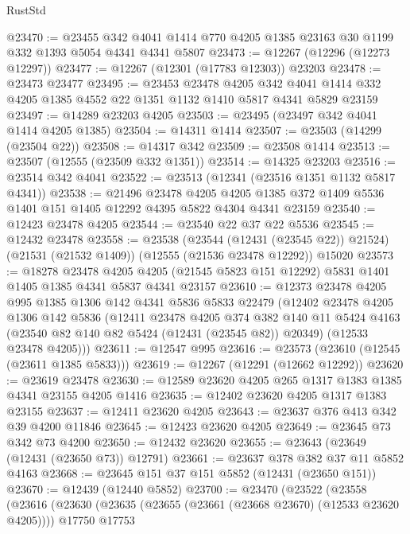 \begin{lexlean}{RustStd}
\begin{coremodule}
@23470 := @23455
    @342
    @4041
    @1414
    @770
    @4205
    @1385
    @23163
    @30
    @1199
    @332
    @1393
    @5054
    @4341
    @4341
    @5807
@23473 := @12267 (@12296 (@12273 @12297))
@23477 := @12267 (@12301 (@17783 @12303)) @23203
@23478 := @23473 @23477
@23495 := @23453
    @23478
    @4205
    @342
    @4041
    @1414
    @332
    @4205
    @1385
    @4552
    @22
    @1351
    @1132
    @1410
    @5817
    @4341
    @5829
    @23159
@23497 := @14289 @23203 @4205
@23503 := @23495 (@23497 @342 @4041 @1414 @4205 @1385)
@23504 := @14311 @1414
@23507 := @23503 (@14299 (@23504 @22))
@23508 := @14317 @342
@23509 := @23508 @1414
@23513 := @23507 (@12555 (@23509 @332 @1351))
@23514 := @14325 @23203
@23516 := @23514 @342 @4041
@23522 := @23513 (@12341 (@23516 @1351 @1132 @5817 @4341))
@23538 := @21496
    @23478
    @4205
    @4205
    @1385
    @372
    @1409
    @5536
    @1401
    @151
    @1405
    @12292
    @4395
    @5822
    @4304
    @4341
    @23159
@23540 := @12423 @23478 @4205
@23544 := @23540 @22 @37 @22 @5536
@23545 := @12432 @23478
@23558 := @23538
    (@23544 (@12431 (@23545 @22)) @21524)
    (@21531 (@21532 @1409))
    (@12555 (@21536 @23478 @12292))
    @15020
@23573 := @18278
    @23478
    @4205
    @4205
    (@21545 @5823 @151 @12292)
    @5831
    @1401
    @1405
    @1385
    @4341
    @5837
    @4341
    @23157
@23610 := @12373
    @23478
    @4205
    @995
    @1385
    @1306
    @142
    @4341
    @5836
    @5833
    @22479
    (@12402
      @23478
      @4205
      @1306
      @142
      @5836
      (@12411
        @23478
        @4205
        @374
        @382
        @140
        @11
        @5424
        @4163
        (@23540 @82 @140 @82 @5424 (@12431 (@23545 @82)) @20349)
        (@12533 @23478 @4205)))
@23611 := @12547 @995
@23616 := @23573 (@23610 (@12545 (@23611 @1385 @5833)))
@23619 := @12267 (@12291 (@12662 @12292))
@23620 := @23619 @23478
@23630 := @12589 @23620 @4205 @265 @1317 @1383 @1385 @4341 @23155 @4205 @1416
@23635 := @12402 @23620 @4205 @1317 @1383 @23155
@23637 := @12411 @23620 @4205
@23643 := @23637 @376 @413 @342 @39 @4200 @11846
@23645 := @12423 @23620 @4205
@23649 := @23645 @73 @342 @73 @4200
@23650 := @12432 @23620
@23655 := @23643 (@23649 (@12431 (@23650 @73)) @12791)
@23661 := @23637 @378 @382 @37 @11 @5852 @4163
@23668 := @23645 @151 @37 @151 @5852 (@12431 (@23650 @151))
@23670 := @12439 (@12440 @5852)
@23700 := @23470
    (@23522
      (@23558
        (@23616
          (@23630
            (@23635 (@23655 (@23661 (@23668 @23670) (@12533 @23620 @4205))))
            @17750
            @17753

\end{coremodule}
\end{lexlean}
